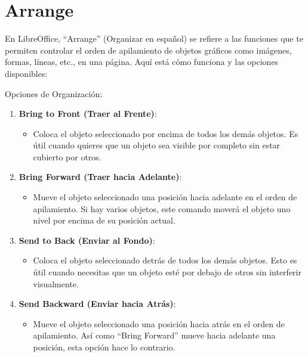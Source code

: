 \documentclass[
  jou,
  floatsintext,
  longtable,
  a4paper,
  nolmodern,
  notxfonts,
  notimes,
  12pt,
  colorlinks=true,linkcolor=blue,citecolor=blue,urlcolor=blue]{apa7}
\providecommand{\tightlist}{%
  \setlength{\itemsep}{0pt}\setlength{\parskip}{0pt}}
\begin{document}
\section{Arrange}\label{arrange}

En LibreOffice, ``Arrange'' (Organizar en español) se refiere a las
funciones que te permiten controlar el orden de apilamiento de objetos
gráficos como imágenes, formas, líneas, etc., en una página. Aquí está
cómo funciona y las opciones disponibles:

Opciones de Organización:

\begin{enumerate}
\def\labelenumi{\arabic{enumi}.}
\item
  \textbf{Bring to Front (Traer al Frente)}:

  \begin{itemize}
  \tightlist
  \item
    Coloca el objeto seleccionado por encima de todos los demás objetos.
    Es útil cuando quieres que un objeto sea visible por completo sin
    estar cubierto por otros.
  \end{itemize}
\item
  \textbf{Bring Forward (Traer hacia Adelante)}:

  \begin{itemize}
  \tightlist
  \item
    Mueve el objeto seleccionado una posición hacia adelante en el orden
    de apilamiento. Si hay varios objetos, este comando moverá el objeto
    uno nivel por encima de su posición actual.
  \end{itemize}
\item
  \textbf{Send to Back (Enviar al Fondo)}:

  \begin{itemize}
  \tightlist
  \item
    Coloca el objeto seleccionado detrás de todos los demás objetos.
    Esto es útil cuando necesitas que un objeto esté por debajo de otros
    sin interferir visualmente.
  \end{itemize}
\item
  \textbf{Send Backward (Enviar hacia Atrás)}:

  \begin{itemize}
  \tightlist
  \item
    Mueve el objeto seleccionado una posición hacia atrás en el orden de
    apilamiento. Así como ``Bring Forward'' mueve hacia adelante una
    posición, esta opción hace lo contrario.
  \end{itemize}
\end{enumerate}
\end{document}
